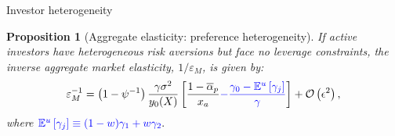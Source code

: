 \documentclass[12pt,aspectratio=169]{beamer}
\providecommand{\propositionname}{Proposition}
\newtheorem{prop}{\protect\propositionname}
\providecommand{\propositionname}{Proposition}
\begin{document}
\begin{frame}{Investor heterogeneity}
    \begin{prop}[Aggregate elasticity: preference heterogeneity]\label{prop_elasticity_pref_heterog}
    	If active investors have heterogeneous risk aversions but face no leverage constraints, the inverse aggregate market elasticity, $ 1/\varepsilon_M $, is given by:
    	\begin{equation*}
    	\varepsilon_{M}^{-1}=%
    	\left(1-\psi^{-1}\right) \frac{\gamma \sigma^{2}}{y_{0}(X)}\left[\frac{1-\overline{\alpha}_{p}}{x_{a}}\textcolor{blue}{-\frac{\gamma_{0}-\mathbb{E}^{u}\left[\gamma_{j}\right]}{\gamma}}\right]+\mathcal{O}\left(\epsilon^{2}\right),
    	\end{equation*}
    	where $\textcolor{blue}{\mathbb{E}^u\left[\gamma_j\right] \equiv (1-w)\gamma_1+w\gamma_2}.$
    \end{prop}
\end{frame}
\end{document}
